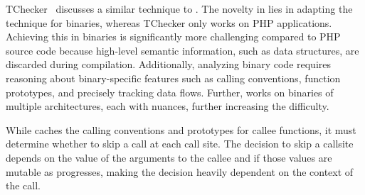 TChecker~\cite{luo2022tchecker} discusses a similar technique to \assumed.
The novelty in \mango lies in adapting the technique for binaries, whereas TChecker only works on PHP applications.
Achieving this in binaries is significantly more challenging compared to PHP source code because high-level semantic information, such as data structures, are discarded during compilation.
Additionally, analyzing binary code requires reasoning about binary-specific features such as calling conventions, function prototypes, and precisely tracking data flows.
Further, \mango works on binaries of multiple architectures, each with nuances, further increasing the difficulty.

While \rda caches the calling conventions and prototypes for callee functions, it must determine whether to skip a call at each call site.
The decision to skip a callsite depends on the value of the arguments to the callee and if those values are mutable as \rda progresses, making the decision heavily dependent on the context of the call.



